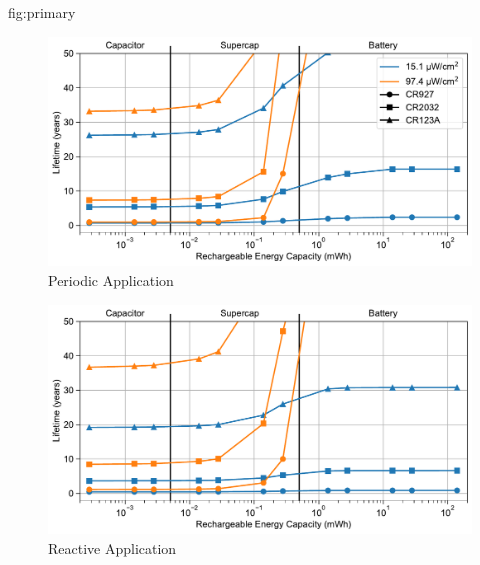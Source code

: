 \begin{definefigure*}{fig:primary}
  \centering
  \begin{subfigure}{\columnwidth}
    \centering
    \includegraphics[width=\linewidth]{figs/capacity/primary/sense_and_send_life_vs_sec_size}
    \caption{Periodic Application}
    \label{fig:primary:sensesec}
  \end{subfigure}
  \begin{subfigure}{\columnwidth}
    \centering
    \includegraphics[width=\linewidth]{figs/capacity/primary/door_occu_life_vs_sec_size}
      \caption{Reactive Application}
    \label{fig:primary:eventsec}
  \end{subfigure}
  \caption{
    \normalfont
    Estimated lifetime
    when varying secondary energy capacity for different harvesting scenarios
    and backup energy storage sizes. 
    The periodic application's period
    is 30\,s and the reactive application events are scaled to
    represent a maximum of 2000 events per hour during the peak hour.
    The backup
    sizes correspond to those found in common coin cell batteries:
}
\end{definefigure*}
